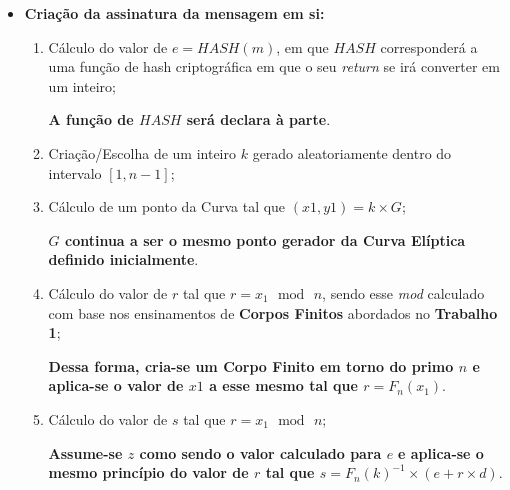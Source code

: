 \documentclass[12pt]{report}
\begin{document}
\begin{itemize}
\vspace{2 mm}
\item
  \textbf{Criação da assinatura da mensagem em si:}

\begin{enumerate}
\vspace{2 mm}
\item
    Cálculo do valor de \(e = HASH(m)\), em que \(HASH\) corresponderá a
    uma função de hash criptográfica em que o seu \emph{return} se irá
    converter em um inteiro;

\vspace{1 mm}
\textbf{A função de \(HASH\) será declara à parte}.

\vspace{2 mm}
\item
    Criação/Escolha de um inteiro \(k\) gerado aleatoriamente dentro do
    intervalo \([1, n-1]\);
\item
    Cálculo de um ponto da Curva tal que \((x1,y1) = k \times G\);

\vspace{1 mm}
\textbf{\(G\) continua a ser o mesmo ponto gerador da Curva Elíptica
      definido inicialmente}.
\vspace{2 mm}
\item
    Cálculo do valor de \(r\) tal que
    \({\displaystyle r=x_{1}\,{\bmod {\,}}n}\), sendo esse \emph{mod}
    calculado com base nos ensinamentos de \textbf{Corpos Finitos}
    abordados no \textbf{Trabalho 1};

\vspace{1 mm}
\textbf{Dessa forma, cria-se um \textbf{Corpo Finito} em torno do primo
      \(n\) e aplica-se o valor de \(x1\) a esse mesmo tal que
      \(r = F_{n}(x_{1})\)}.
\vspace{2 mm}
\item
    Cálculo do valor de \(s\) tal que
    \({\displaystyle r=x_{1}\,{\bmod {\,}}n}\);

\vspace{1 mm}
\textbf{Assume-se \(z\) como sendo o valor calculado para \(e\)}
\textbf{
      e aplica-se o mesmo princípio do valor de \(r\) tal que
      \(s = F_{n}(k)^{-1} \times (e + r \times d)\)}.
\end{enumerate}
\end{itemize}
\vspace{4 mm}
\end{document}
